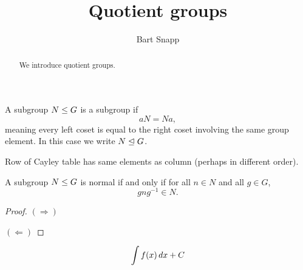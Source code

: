 \documentclass{ximera}
\author{Bart Snapp}
\title{Quotient groups}
\begin{document}
\begin{abstract}
  We introduce quotient groups.
\end{abstract}
\maketitle

\begin{definition}
  A subgroup $N\leq G$ is a  subgroup if
  \[
  aN = Na,
  \]
  meaning every left coset is equal to the right coset involving the
  same group element. In this case we write $N\trianglelefteq G$. 
\end{definition}

Row of Cayley table has same elements as column (perhaps in different order).



\begin{lemma}
  A subgroup $N\leq G$ is normal if and only if for all $n\in N$ and
  all $g\in G$,
  \[
  gng^{-1}\in N.
  \]
  \begin{proof}
    $(\Rightarrow)$

    $(\Leftarrow)$
  \end{proof}
\end{lemma}



\[
\int f(x) \, d x + C
\]
\end{document}
